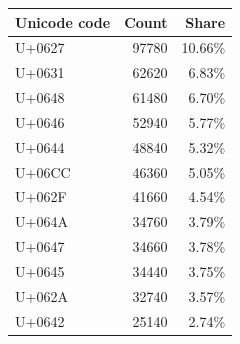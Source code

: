 \begin{tabular}{lrr}
\toprule
Unicode code & Count & Share \\
\midrule
U+0627 & 97780 & 10.66\% \\
U+0631 & 62620 & 6.83\% \\
U+0648 & 61480 & 6.70\% \\
U+0646 & 52940 & 5.77\% \\
U+0644 & 48840 & 5.32\% \\
U+06CC & 46360 & 5.05\% \\
U+062F & 41660 & 4.54\% \\
U+064A & 34760 & 3.79\% \\
U+0647 & 34660 & 3.78\% \\
U+0645 & 34440 & 3.75\% \\
U+062A & 32740 & 3.57\% \\
U+0642 & 25140 & 2.74\% \\
\bottomrule
\end{tabular}
